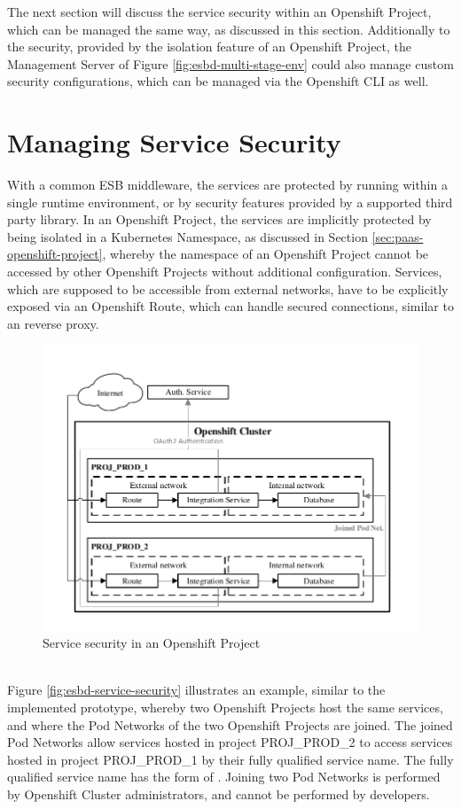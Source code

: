 The next section will discuss the service security within an Openshift Project, which can be managed the same way, as discussed in this section. Additionally to the security, provided by the isolation feature of an Openshift Project, the Management Server of Figure \vref{fig:esbd-multi-stage-env} could also manage custom security configurations, which can be managed via the Openshift CLI as well. 

\section{Managing Service Security}
\label{sec:esbd-service-security}
With a common ESB middleware, the services are protected by running within a single runtime environment, or by security features provided by a supported third party library. In an Openshift Project, the services are implicitly protected by being isolated in a Kubernetes Namespace, as discussed in Section \vref{sec:paas-openshift-project}, whereby the namespace of an Openshift Project cannot be accessed by other Openshift Projects without additional configuration. Services, which are supposed to be accessible from external networks, have to be explicitly exposed via an Openshift Route, which can handle secured connections, similar to an reverse proxy.
\newpage

\begin{figure}[htbp]
	\centering
	\includegraphics[scale=1]{images/esbd-service-security.pdf}
	\caption{Service security in an Openshift Project}
	\label{fig:esbd-service-security}
\end{figure}
\ \\
Figure \vref{fig:esbd-service-security} illustrates an example, similar to the implemented prototype, whereby two Openshift Projects host the same services, and where the Pod Networks of the two Openshift Projects are joined. The joined Pod Networks allow services hosted in project PROJ\_PROD\_2 to access services hosted in project PROJ\_PROD\_1 by their fully qualified service name. The fully qualified service name has the form of . Joining two Pod Networks is performed by Openshift Cluster administrators, and cannot be performed by developers. \\

